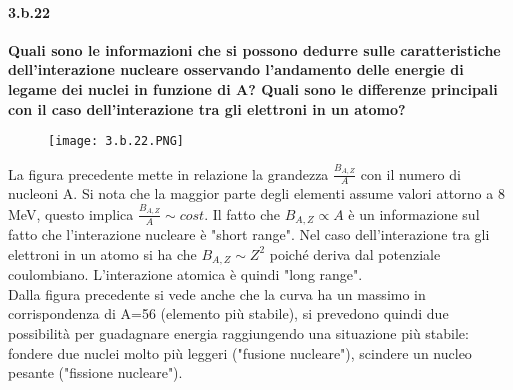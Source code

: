 \documentclass[twoside]{article}
\begin{document}
\paragraph{3.b.22}\textbf{Quali sono le informazioni che si possono dedurre sulle caratteristiche dell'interazione nucleare osservando l’andamento delle energie di legame dei
nuclei in funzione di A? Quali sono le differenze principali con il caso dell'interazione tra gli elettroni in un atomo?}\\
\begin{figure}[H]
    \centering
    \texttt{[image: 3.b.22.PNG]}
\end{figure}
La figura precedente mette in relazione la grandezza $\frac{B_{A,Z}}{A}$ con il numero di nucleoni A. Si nota che la maggior parte degli elementi assume valori attorno a 8 MeV, questo implica $\frac{B_{A,Z}}{A} \sim cost$. Il fatto che $ B_{A,Z} \propto A$ è un informazione sul fatto che l'interazione nucleare è "short range". Nel caso dell'interazione tra gli elettroni in un atomo si ha che $ B_{A,Z} \sim Z^2$ poiché deriva dal potenziale coulombiano. L'interazione atomica è quindi "long range".\\
Dalla figura precedente si vede anche che la curva ha un massimo in corrispondenza di A=56 (elemento più stabile), si prevedono quindi due possibilità per guadagnare energia raggiungendo una situazione più stabile: fondere due nuclei molto più leggeri ("fusione nucleare"), scindere un nucleo pesante ("fissione nucleare").
\end{document}
